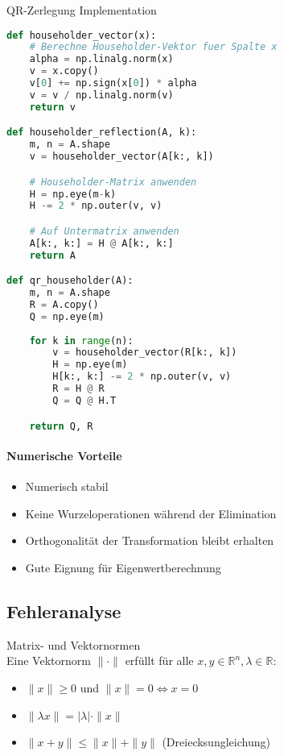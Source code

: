 \begin{examplecode}{QR-Zerlegung Implementation}
\begin{lstlisting}[language=Python, style=basesmol]
def householder_vector(x):
    # Berechne Householder-Vektor fuer Spalte x
    alpha = np.linalg.norm(x)
    v = x.copy()
    v[0] += np.sign(x[0]) * alpha
    v = v / np.linalg.norm(v)
    return v

def householder_reflection(A, k):
    m, n = A.shape
    v = householder_vector(A[k:, k])

    # Householder-Matrix anwenden
    H = np.eye(m-k)
    H -= 2 * np.outer(v, v)

    # Auf Untermatrix anwenden
    A[k:, k:] = H @ A[k:, k:]
    return A

def qr_householder(A):
    m, n = A.shape
    R = A.copy()
    Q = np.eye(m)
    
    for k in range(n):
        v = householder_vector(R[k:, k])
        H = np.eye(m)
        H[k:, k:] -= 2 * np.outer(v, v)
        R = H @ R
        Q = Q @ H.T

    return Q, R
\end{lstlisting}

\paragraph{Numerische Vorteile}
\begin{itemize}
    \item Numerisch stabil
    \item Keine Wurzeloperationen während der Elimination
    \item Orthogonalität der Transformation bleibt erhalten
    \item Gute Eignung für Eigenwertberechnung
\end{itemize}
\end{examplecode}

\subsection{Fehleranalyse}

\begin{definition}{Matrix- und Vektornormen}\\
Eine Vektornorm $\|\cdot\|$ erfüllt für alle $x,y \in \mathbb{R}^n, \lambda \in \mathbb{R}$:
\begin{itemize}
    \item $\|x\| \geq 0$ und $\|x\| = 0 \Leftrightarrow x = 0$
    \item $\|\lambda x\| = |\lambda| \cdot \|x\|$
    \item $\|x + y\| \leq \|x\| + \|y\|$ (Dreiecksungleichung)
\end{itemize}
\end{definition}

